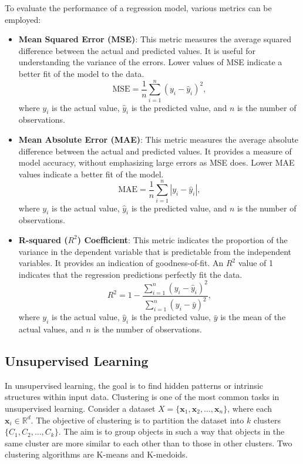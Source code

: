 \documentclass[12pt]{book}
\begin{document}
To evaluate the performance of a regression model, various metrics can be employed:

\begin{itemize}
    \item \textbf{Mean Squared Error (MSE)}: This metric measures the average squared difference between the actual and predicted values. It is useful for understanding the variance of the errors. Lower values of MSE indicate a better fit of the model to the data.
    \[
    \text{MSE} = \frac{1}{n} \sum_{i=1}^{n} (y_i - \hat{y}_i)^2,
    \]
    where $y_i$ is the actual value, $\hat{y}_i$ is the predicted value, and $n$ is the number of observations.

    \item \textbf{Mean Absolute Error (MAE)}: This metric measures the average absolute difference between the actual and predicted values. It provides a measure of model accuracy, without emphasizing large errors as MSE does. Lower MAE values indicate a better fit of the model.
    \[
    \text{MAE} = \frac{1}{n} \sum_{i=1}^{n} |y_i - \hat{y}_i|,
    \]
    where $y_i$ is the actual value, $\hat{y}_i$ is the predicted value, and $n$ is the number of observations.

    \item \textbf{R-squared ($R^2$) Coefficient}: This metric indicates the proportion of the variance in the dependent variable that is predictable from the independent variables. It provides an indication of goodness-of-fit. An $R^2$ value of 1 indicates that the regression predictions perfectly fit the data.
    \[
    R^2 = 1 - \frac{\sum_{i=1}^{n} (y_i - \hat{y}_i)^2}{\sum_{i=1}^{n} (y_i - \bar{y})^2},
    \]
    where $y_i$ is the actual value, $\hat{y}_i$ is the predicted value, $\bar{y}$ is the mean of the actual values, and $n$ is the number of observations.
\end{itemize}

\subsection{Unsupervised Learning}
In unsupervised learning, the goal is to find hidden patterns or intrinsic structures within input data. Clustering is one of the most common tasks in unsupervised learning. Consider a dataset $X = \{\mathbf{x}_1, \mathbf{x}_2, \ldots, \mathbf{x}_n\}$, where each $\mathbf{x}_i \in \mathbb{R}^d$. The objective of clustering is to partition the dataset into $k$ clusters $\{C_1, C_2, \ldots, C_k\}$. The aim is to group objects in such a way that objects in the same cluster are more similar to each other than to those in other clusters. Two clustering algorithms are K-means and K-medoids.
\end{document}
